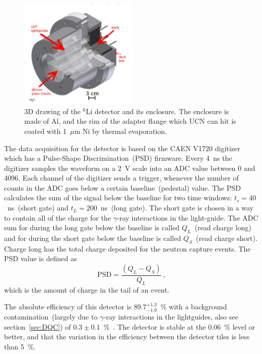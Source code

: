\begin{figure}[h!]
  \centering
  \includegraphics[width=0.5\textwidth]{Li6detector.png}
  \caption[3D drawing of the $^6$Li detector and its enclosure]{3D
    drawing of the $^6$Li detector and its enclosure. The enclosure is
    made of Al, and the rim of the adapter flange which UCN can hit is
    coated with 1~$\mu$m Ni by thermal evaporation. }
  \label{fig:Li6detector}
\end{figure}

The data acquisition for the detector is based on the CAEN V1720
digitizer which has a Pulse-Shape Discrimination~(PSD) firmware. Every
4~ns the digitizer samples the waveform on a 2~V scale into an ADC
value between 0 and 4096. Each channel of the digitizer sends a
trigger, whenever the number of counts in the ADC goes below a certain
baseline~(pedestal) value. The PSD calculates the sum of the signal
below the baseline for two time windows: $t_s = 40$~ns~(short gate)
and $t_L = 200$~ns~(long gate). The short gate is chosen in a way to
contain all of the charge for the $\gamma$-ray interactions in the
light-guide. The ADC sum for during the long gate below the baseline
is called $Q_L$~(read charge long) and for during the short gate below
the baseline is called $Q_S$~(read charge short). Charge long has the
total charge deposited for the neutron capture events. The PSD value is
defined as
\begin{equation}
  \label{eq:psd}
  \mathrm{PSD} = \frac{\left( Q_L - Q_S\right)}{Q_L}~,
\end{equation}  
which is the amount of charge in the tail of an event.

The absolute efficiency of this detector is $89.7^{+1.3}_{-1.9}$~\%
with a background contamination~(largely due to $\gamma$-ray
interactions in the lightguides, also see section~\ref{sec:DQC}) of
$0.3 \pm 0.1$~\%~\cite{jamieson2017characterization}. The detector is
stable at the 0.06~\% level or better, and that the variation in the
efficiency between the detector tiles is less than 5~\%.
